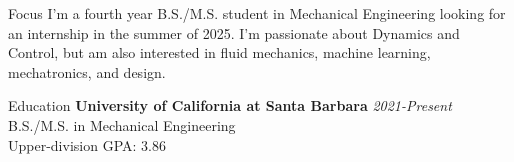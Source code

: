 \documentclass[
	11pt, %
]{resume} %
\begin{document}
\begin{rSection}{Focus}
	I'm a fourth year B.S./M.S. student in Mechanical Engineering looking for an internship in the summer of 2025. 
	I'm  passionate about Dynamics and Control, but am also interested in fluid mechanics, machine learning, mechatronics, and design.
\end{rSection}
\begin{rSection}{Education}	
	\textbf{University of California at Santa Barbara} \hfill \textit{2021-Present} \\ 
	B.S./M.S. in Mechanical Engineering \\
	Upper-division GPA: 3.86 \\
\end{rSection}

\end{document}
